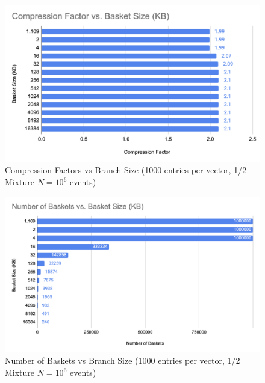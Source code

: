 \begin{figure}[h]
    \centering
    \vspace{20px}
    \includegraphics[width=.8\textwidth]{content/toymodel_content/Compression Factor vs. Branch Size (KB).png}
    \caption{Compression Factors vs Branch Size (1000 entries per vector, 1/2 Mixture $N=10^6$ events)}
    \vspace{20px}
    \label{fig:toymodel_CFvsBranchSize_1/2mixture}
\end{figure}

\begin{figure}[h]
    \centering
    \vspace{20px}
    \includegraphics[width=.8\textwidth]{content/toymodel_content/Number of Baskets vs Branch Size.png}
    \caption{Number of Baskets vs Branch Size (1000 entries per vector, 1/2 Mixture $N=10^6$ events)}
    \vspace{20px}
    \label{fig:toymodel_NumBasketsvsBranchSize_1/2mixture}
\end{figure}

